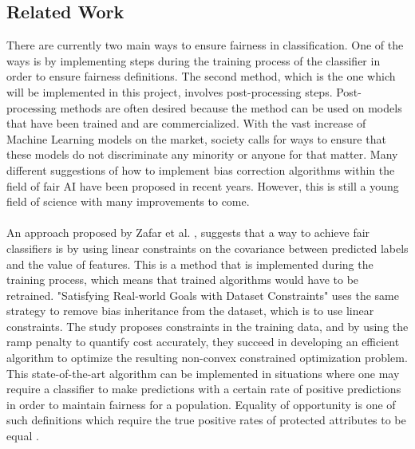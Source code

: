 \documentclass[11pt, fleqn, titlepage]{article}
\begin{document}
	\subsection{Related Work}
	There are currently two main ways to ensure fairness in classification. One of the ways is by implementing steps during the training process of the classifier in order to ensure fairness definitions. The second method, which is the one which will be implemented in this project, involves post-processing steps. Post-processing methods are often desired because the method can be used on models that have been trained and are commercialized. With the vast increase of Machine Learning models on the market, society calls for ways to ensure that these models do not discriminate any minority or anyone for that matter. Many different suggestions of how to implement bias correction algorithms within the field of fair AI have been proposed in recent years. However, this is still a young field of science with many improvements to come.\\\\
	\noindent
	An approach proposed by Zafar et al. \cite{Zafar}, suggests that a way to achieve fair classifiers is by using linear constraints on the covariance between predicted labels and the value of features. This is a method that is implemented during the training process, which means that trained algorithms would have to be retrained. "Satisfying Real-world Goals with Dataset Constraints" uses the same strategy to remove bias inheritance from the dataset, which is to use linear constraints. The study proposes constraints in the training data, and by using the ramp penalty to quantify cost accurately, they succeed in developing an efficient algorithm to optimize the resulting non-convex constrained optimization problem. This state-of-the-art algorithm can be implemented in situations where one may require a classifier to make predictions with a certain rate of positive predictions in order to maintain fairness for a population. Equality of opportunity is one of such definitions which require the true positive rates of protected attributes to be equal \cite{g_goh}. \\
	
\end{document}
